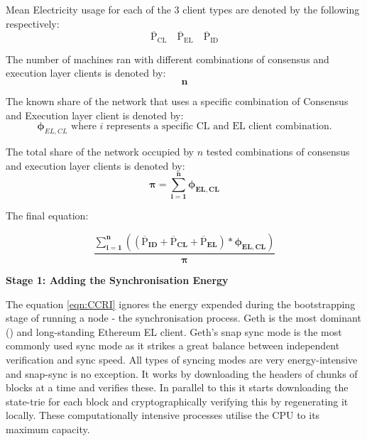 Mean Electricity usage for each of the 3 client types are denoted by the following respectively: 
\begin{equation*}
  \boldsymbol{\mathrm{{\overline{P}}_{CL}}}\quad      \boldsymbol{\mathrm{{\overline{P}}_{EL}}}\quad  \boldsymbol{\mathrm{{\overline{P}}_{ID}}}   
\end{equation*}

The number of machines ran with different combinations of consensus and execution layer clients is denoted by:
\begin{equation*}
    \boldsymbol{n}
\end{equation*}

The known share of the network that uses a specific combination of Consensus and Execution layer client is denoted by:
\begin{equation*}
    \boldsymbol{\phi}_{EL,CL} \text{ where } {i} \text{ represents a specific CL and EL client combination.}
\end{equation*}

The total share of the network occupied by ${n}$ tested combinations of consensus and execution layer clients is denoted by:
\begin{equation*}
    \boldsymbol{{\pi} = \displaystyle\sum\limits_{i=1}^{n}{\phi_{EL,CL}}}
\end{equation*}

The final equation: 

\begin{equation}
\boldsymbol{\frac{\displaystyle\sum\limits_{i=1}^{n}{ \left({\left(\mathrm{\overline{P}}_{ID} + \mathrm{\overline{P}}_{CL} + \mathrm{\overline{P}}_{EL}\right)} * {\phi_{EL,CL}} \right)}}
 {\pi}}\label{eqn:CCRI}
\end{equation}



\textbf{Stage 1: Adding the Synchronisation Energy} 

 The equation \ref{eqn:CCRI} ignores the energy expended during the bootstrapping stage of running a node - the synchronisation process. Geth is the most dominant () and long-standing Ethereum EL client. Geth's snap sync mode is the most commonly used sync mode as it strikes a great balance between independent verification and sync speed.
 All types of syncing modes are very energy-intensive and snap-sync is no exception. It works by downloading the headers of chunks of blocks at a time and verifies these. In parallel to this it starts downloading the state-trie for each block and cryptographically verifying this by regenerating it locally. These computationally intensive processes utilise the CPU to its maximum capacity.

